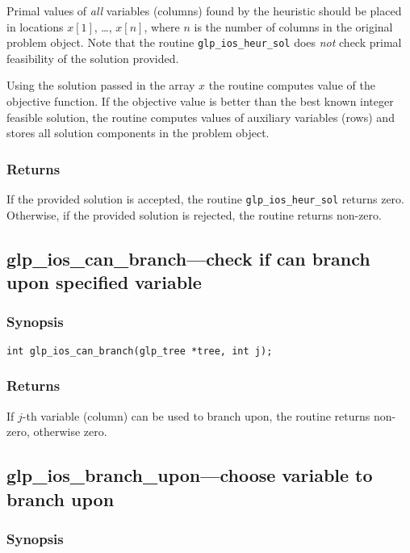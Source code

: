 Primal values of {\it all} variables (columns) found by the heuristic
should be placed in locations $x[1]$, \dots, $x[n]$, where $n$ is the
number of columns in the original problem object. Note that the routine
\verb|glp_ios_heur_sol| does {\it not} check primal feasibility of the
solution provided.

Using the solution passed in the array $x$ the routine computes value
of the objective function. If the objective value is better than the
best known integer feasible solution, the routine computes values of
auxiliary variables (rows) and stores all solution components in the
problem object.

\subsubsection*{Returns}

If the provided solution is accepted, the routine
\verb|glp_ios_heur_sol| returns zero. Otherwise, if the provided
solution is rejected, the routine returns non-zero.

\subsection{glp\_ios\_can\_branch---check if can branch upon specified
variable}

\subsubsection*{Synopsis}

\begin{verbatim}
int glp_ios_can_branch(glp_tree *tree, int j);
\end{verbatim}

\subsubsection*{Returns}

If $j$-th variable (column) can be used to branch upon, the routine
returns non-zero, otherwise zero.

\newpage

\subsection{glp\_ios\_branch\_upon---choose variable to branch upon}

\subsubsection*{Synopsis}

